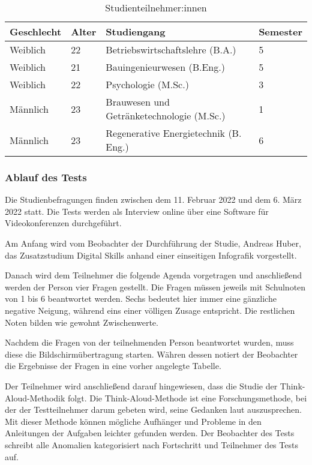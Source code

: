 \begin{table}[H]
\renewcommand*{\arraystretch}{1.6}
\centering
\begin{tabular}{|l|l|l|l|}
\hline
\textbf{Geschlecht} & \textbf{Alter} & \textbf{Studiengang}                      & \textbf{Semester} \\ \hline
Weiblich            & 22             & Betriebswirtschaftslehre (B.A.)           & 5                 \\ \hline
Weiblich            & 21             & Bauingenieurwesen (B.Eng.)                & 5                 \\ \hline
Weiblich            & 22             & Psychologie (M.Sc.)                       & 3                 \\ \hline
Männlich            & 23             & Brauwesen und Getränketechnologie (M.Sc.) & 1                 \\ \hline
Männlich            & 23             & Regenerative Energietechnik (B. Eng.)     & 6                 \\ \hline
\end{tabular}
\caption{Studienteilnehmer:innen}

\label{table:studie-teilnehmende}
\end{table}

\subsubsection{Ablauf des Tests}
Die Studienbefragungen finden zwischen dem 11. Februar 2022 und dem 6. März
2022 statt. Die Tests werden als Interview online über eine Software für
Videokonferenzen durchgeführt.

Am Anfang wird vom Beobachter der Durchführung der Studie, Andreas Huber, das
Zusatzstudium Digital Skills anhand einer einseitigen Infografik vorgestellt.

Danach wird dem Teilnehmer die folgende Agenda vorgetragen und anschließend
werden der Person vier Fragen gestellt. Die Fragen müssen jeweils mit Schulnoten
von 1 bis 6 beantwortet werden. Sechs bedeutet hier immer eine gänzliche
negative Neigung, während eins einer völligen Zusage entspricht. Die restlichen
Noten bilden wie gewohnt Zwischenwerte.

Nachdem die Fragen von der teilnehmenden Person beantwortet wurden, muss diese
die Bildschirmübertragung starten. Währen dessen notiert der Beobachter die
Ergebnisse der Fragen in eine vorher angelegte Tabelle.

Der Teilnehmer wird anschließend darauf hingewiesen, dass die Studie der
Think-Aloud-Methodik folgt. Die Think-Aloud-Methode ist eine Forschungsmethode,
bei der der Testteilnehmer darum gebeten wird, seine Gedanken laut
auszusprechen. Mit dieser Methode können mögliche Aufhänger und Probleme in den
Anleitungen der Aufgaben leichter gefunden werden. Der Beobachter des Tests
schreibt alle Anomalien kategorisiert nach Fortschritt und Teilnehmer des Tests
auf.

